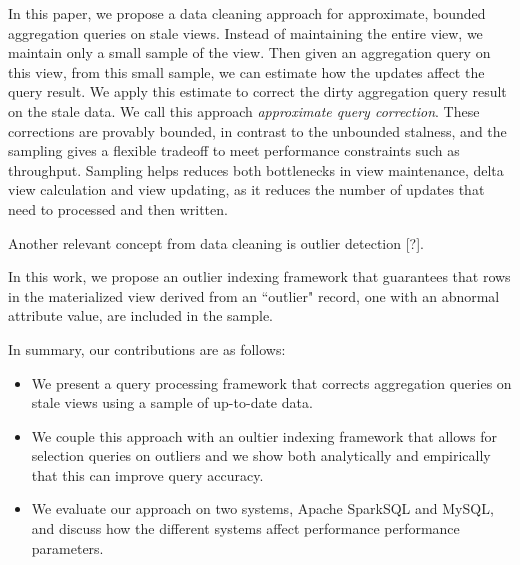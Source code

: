 In this paper, we propose a data cleaning approach for approximate,
bounded aggregation queries on stale views. Instead of maintaining
the entire view, we maintain only a small sample of the view. Then
given an aggregation query on this view, from this small sample, we
can estimate how the updates affect the query result. We apply this
estimate to correct the dirty aggregation query result on the stale
data. We call this approach \emph{approximate query correction}. 
These corrections are provably bounded, in contrast to the unbounded stalness,
and the sampling gives a flexible tradeoff to meet performance constraints such as throughput.
Sampling helps reduces both bottlenecks in view maintenance, delta
view calculation and view updating, as it reduces the number of updates
that need to processed and then written.

Another relevant concept from data cleaning is outlier detection {[}?{]}.

In this work, we propose an outlier indexing framework that guarantees that
rows in the materialized view derived from an ``outlier" record, one with
an abnormal attribute value, are included in the sample.

In summary, our contributions are as follows:
\begin{itemize}
\item We present a query processing framework that corrects aggregation queries on stale
views using a sample of up-to-date data.
\item We couple this approach with an oultier indexing framework that allows
for selection queries on outliers and we show both analytically and empirically that 
this can improve query accuracy.
\item We evaluate our approach on two systems, Apache SparkSQL and MySQL,
and discuss how the different systems affect performance performance
parameters.
\end{itemize}
\fi
